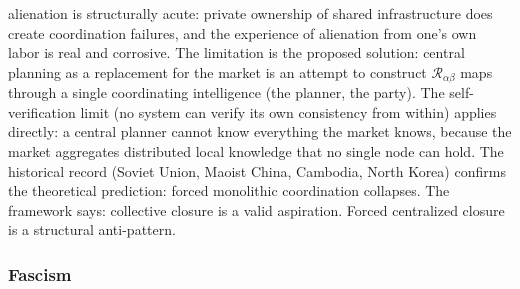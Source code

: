 \documentclass[
]{article}
\begin{document}
\begin{enumerate}
  alienation is structurally acute: private ownership of shared
  infrastructure does create coordination failures, and the experience
  of alienation from one's own labor is real and corrosive. The
  limitation is the proposed solution: central planning as a replacement
  for the market is an attempt to construct
  \(\mathcal{R}_{\alpha\beta}\) maps through a single coordinating
  intelligence (the planner, the party). The self-verification limit (no
  system can verify its own consistency from within) applies directly: a
  central planner cannot know everything the market knows, because the
  market aggregates distributed local knowledge that no single node can
  hold. The historical record (Soviet Union, Maoist China, Cambodia,
  North Korea) confirms the theoretical prediction: forced monolithic
  coordination collapses. The framework says: collective closure is a
  valid aspiration. Forced centralized closure is a structural
  anti-pattern.
\end{enumerate}

\subsubsection{Fascism}\label{fascism}
\end{document}
